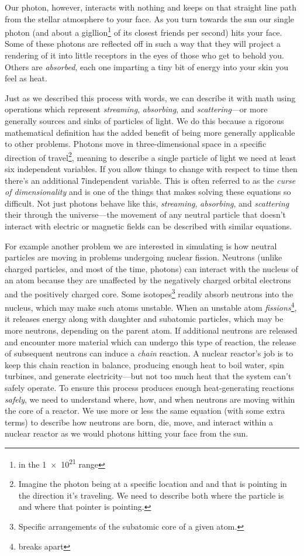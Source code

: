 Our photon, however, interacts with nothing and keeps on that straight line path from the stellar atmosphere to your face.
As you turn towards the sun our single photon (and about a gigllion\footnote{in the \num{1e21} range} of its closest friends per second) hits your face.
Some of these photons are reflected off in such a way that they will project a rendering of it into little receptors in the eyes of those who get to behold you.
Others are \textit{absorbed}, each one imparting a tiny bit of energy into your skin you feel as heat.

Just as we described this process with words, we can describe it with math using operations which represent \textit{streaming}, \textit{absorbing}, and \textit{scattering}---or more generally sources and sinks of particles of light.
We do this because a rigorous mathematical definition has the added benefit of being more generally applicable to other problems.
Photons move in three-dimensional space in a specific direction of travel\footnote{
Imagine the photon being at a specific location and and that is pointing in the direction it's traveling. We need to describe both where the particle is and where that pointer is pointing.},
meaning to describe a single particle of light we need at least six independent variables.
If you allow things to change with respect to time then there's an additional 7\ths independent variable.
This is often referred to as the \textit{curse of dimensionality} and is one of the things that makes solving these equations so difficult.
Not just photons behave like this, \textit{streaming}, \textit{absorbing}, and \textit{scattering} their through the universe---the movement of any neutral particle that doesn't interact with electric or magnetic fields can be described with similar equations.

For example another problem we are interested in simulating is how neutral particles are moving in problems undergoing nuclear fission.
Neutrons (unlike charged particles, and most of the time, photons) can interact with the nucleus of an atom because they are unaffected by the negatively charged orbital electrons and the positively charged core.
Some isotopes\footnote{Specific arrangements of the subatomic core of a given atom.} readily absorb neutrons into the nucleus, which may make such atoms unstable.
When an unstable atom \textit{fissions}\footnote{breaks apart}, it releases energy along with daughter and subatomic particles, which may be more neutrons, depending on the parent atom.
If additional neutrons are released and encounter more material which can undergo this type of reaction, the release of subsequent neutrons can induce a \textit{chain} reaction.
A nuclear reactor's job is to keep this chain reaction in balance, producing enough heat to boil water, spin turbines, and generate electricity---but not too much heat that the system can't safely operate.
To ensure this process produces enough heat-generating reactions \textit{safely}, we need to understand where, how, and when neutrons are moving within the core of a reactor.
We use more or less the same equation (with some extra terms) to describe how neutrons are born, die, move, and interact within a nuclear reactor as we would photons hitting your face from the sun.

